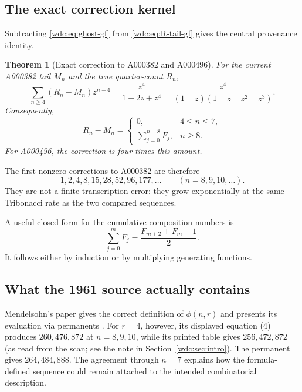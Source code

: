\documentclass[11pt,letterpaper]{article}
\numberwithin{equation}{section}
\newtheorem{theorem}{Theorem}[section]
\theoremstyle{definition}
\begin{document}
\subsection{The exact correction kernel}

Subtracting \eqref{wdc:eq:ghost-gf} from \eqref{wdc:eq:R-tail-gf} gives the central
provenance identity.

\begin{theorem}[Exact correction to A000382 and A000496]\label{wdc:thm:correction}
For the current A000382 tail $M_n$ and the true quarter-count $R_n$,
\begin{equation}\label{wdc:eq:correction-gf}
  \boxed{
  \sum_{n\ge4}(R_n-M_n)z^{n-4}
  =\frac{z^4}{1-2z+z^4}
  =\frac{z^4}{(1-z)(1-z-z^2-z^3)}.}
\end{equation}
Consequently,
\begin{equation}\label{wdc:eq:correction-sum}
  R_n-M_n=
  \begin{cases}
    0,&4\le n\le7,\\[2mm]
    \displaystyle\sum_{j=0}^{n-8}F_j,&n\ge8.
  \end{cases}
\end{equation}
For A000496, the correction is four times this amount.
\end{theorem}

The first nonzero corrections to A000382 are therefore
\begin{equation}\label{wdc:eq:correction-values}
  1,2,4,8,15,28,52,96,177,\dots\qquad(n=8,9,10,\dots).
\end{equation}
They are not a finite transcription error: they grow exponentially at the same
Tribonacci rate as the two compared sequences.

A useful closed form for the cumulative composition numbers is
\begin{equation}\label{wdc:eq:cumulative-F}
  \sum_{j=0}^{m}F_j=\frac{F_{m+2}+F_m-1}{2}.
\end{equation}
It follows either by induction or by multiplying generating functions.

\subsection{What the 1961 source actually contains}

Mendelsohn's paper gives the correct definition of $\phi(n,r)$ and presents
its evaluation via permanents \cite{mendelsohn1961}.  For $r=4$, however,
its displayed equation (4) produces $260,476,872$ at $n=8,9,10$, while its
printed table gives $256,472,872$ (as read from the scan; see the note in
Section~\ref{wdc:sec:intro}).  The permanent gives $264,484,888$.
The agreement through $n=7$ explains how the formula-defined sequence could
remain attached to the intended combinatorial description.
\end{document}
